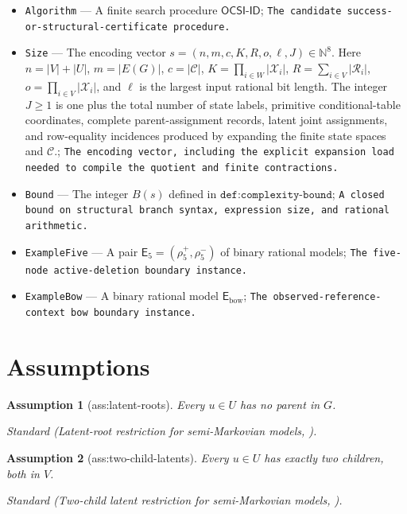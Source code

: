 \documentclass{article}
\newtheorem{assumption}{Assumption}
\begin{document}
\begin{itemize}
  \item \texttt{Algorithm} --- A finite search procedure \(\mathsf{OCSI\text{-}ID}\); \texttt{The candidate success-\allowbreak{}or-\allowbreak{}structural-\allowbreak{}certificate procedure.}
  \item \texttt{Size} --- The encoding vector \(s=(n,m,c,K,R,o,\ell,J)\in\mathbb N^8\). Here \(n=|V|+|U|\), \(m=|E(G)|\), \(c=|\mathcal C|\), \(K=\prod_{i\in W}|\mathcal X_i|\), \(R=\sum_{i\in V}|\mathcal R_i|\), \(o=\prod_{i\in V}|\mathcal X_i|\), and \(\ell\) is the largest input rational bit length. The integer \(J\geq1\) is one plus the total number of state labels, primitive conditional-table coordinates, complete parent-assignment records, latent joint assignments, and row-equality incidences produced by expanding the finite state spaces and \(\mathcal C\).; \texttt{The encoding vector,\allowbreak{} including the explicit expansion load needed to compile the quotient and finite contractions.}
  \item \texttt{Bound} --- The integer \(B(s)\) defined in \(\texttt{def:complexity-bound}\); \texttt{A closed bound on structural branch syntax,\allowbreak{} expression size,\allowbreak{} and rational arithmetic.}
  \item \texttt{ExampleFive} --- A pair \(\mathsf E_5=(\rho^+_5,\rho^-_5)\) of binary rational models; \texttt{The five-\allowbreak{}node active-\allowbreak{}deletion boundary instance.}
  \item \texttt{ExampleBow} --- A binary rational model \(\mathsf E_{\mathrm{bow}}\); \texttt{The observed-\allowbreak{}reference-\allowbreak{}context bow boundary instance.}
\end{itemize}

\section{Assumptions}

\begin{assumption}[ass:latent-roots]\label{ass:latent-roots}
Every \(u\in U\) has no parent in \(G\).
\par\smallskip\noindent\emph{Standard} (Latent-root restriction for semi-Markovian models, \cite{ShpitserPearl2006JointInterventional}).
\end{assumption}

\begin{assumption}[ass:two-child-latents]\label{ass:two-child-latents}
Every \(u\in U\) has exactly two children, both in \(V\).
\par\smallskip\noindent\emph{Standard} (Two-child latent restriction for semi-Markovian models, \cite{ShpitserPearl2006JointInterventional}).
\end{assumption}
\end{document}
